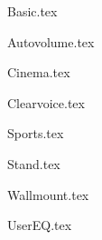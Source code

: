 {Basic.tex}

{Autovolume.tex}

{Cinema.tex}

{Clearvoice.tex}

{Sports.tex}

{Stand.tex}

{Wallmount.tex}





{UserEQ.tex}
